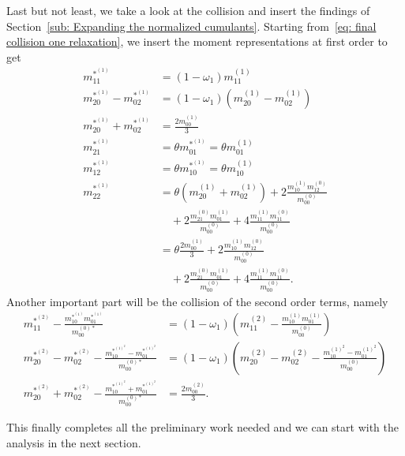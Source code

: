 Last but not least, we take a look at the collision and insert the findings of Section~\ref{sub: Expanding the normalized cumulants}.
Starting from~\eqref{eq: final collision one relaxation}, we insert the moment representations at first order to get
\begin{equation}
  \begin{aligned}
    m_{11}^{*^{(1)}} & = (1-\omega_1) m_{11}^{(1)} \\
    m_{20}^{*^{(1)}} - m_{02}^{*^{(1)}}
      & = (1-\omega_1) (m_{20}^{(1)} - m_{02}^{(1)}) \\
    m_{20}^{*^{(1)}} + m_{02}^{*^{(1)}}
      & =  \frac{2 m_{00}^{(1)}}{3} \\
    m_{21}^{*^{(1)}} & = \theta m_{01}^{*^{(1)}} = \theta m_{01}^{(1)} \\
    m_{12}^{*^{(1)}} & = \theta m_{10}^{*^{(1)}} = \theta m_{10}^{(1)} \\
    m_{22}^{*^{(1)}} & =  \theta (m_{20}^{(1)} + m_{02}^{(1)})
      + 2\frac{ m_{10}^{(1)} m_{12}^{(0)} }{m_{00}^{(0)}}
      \\&\quad
      + 2\frac{ m_{21}^{(0)} m_{01}^{(1)} }{m_{00}^{(0)}}
      + 4\frac{ m_{11}^{(1)} m_{11}^{(0)} }{m_{00}^{(0)}}
      \\&= \theta \frac{2 m_{00}^{(1)}}{3} + 2\frac{ m_{10}^{(1)} m_{12}^{(0)} }{m_{00}^{(0)}}
      \\&\quad
      + 2\frac{ m_{21}^{(0)} m_{01}^{(1)} }{m_{00}^{(0)}}
      + 4\frac{ m_{11}^{(1)} m_{11}^{(0)} }{m_{00}^{(0)}}.
  \end{aligned}
\end{equation}
Another important part will be the collision of the second order terms, namely
\begin{align}
  m_{11}^{*^{(2)}} - \frac{ m_{10}^{*^{(1)}}m_{01}^{*^{(1)}}}{m_{00}^{(0)*}} & = (1-\omega_1)\left(m_{11}^{(2)} - \frac{ m_{10}^{(1)}m_{01}^{(1)}}{m_{00}^{(0)}}\right) \\
  m_{20}^{*^{(2)}}-m_{02}^{*^{(2)}} - \frac{ m_{10}^{*^{{(1)}^2}} - m_{01}^{*^{{(1)}^2}}}{m_{00}^{(0)*}} & = (1-\omega_1) \left(m_{20}^{(2)}-m_{02}^{(2)} - \frac{ m_{10}^{{(1)}^2} - m_{01}^{{(1)}^2}}{m_{00}^{(0)}}\right) \\
  m_{20}^{*^{(2)}}+m_{02}^{*^{(2)}} - \frac{ m_{10}^{*^{{(1)}^2}} + m_{01}^{*^{{(1)}^2}}}{m_{00}^{(0)*}} & = \frac{2 m_{00}^{(2)}}{3}.
\end{align}

This finally completes all the preliminary work needed and we can start with the analysis in the next section.
